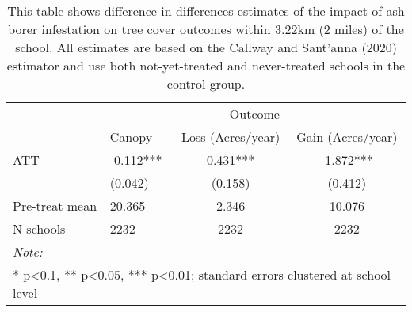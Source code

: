 \begin{table}[!h]

\caption{\label{tab:school-tree-table}This table shows difference-in-differences estimates of the impact of ash borer infestation on tree cover outcomes within 3.22km (2 miles) of the school. All estimates are based on the Callway and Sant'anna (2020) estimator and use both not-yet-treated and never-treated schools in the control group.}
\centering
\begin{tabular}[t]{llcc}
\toprule
\multicolumn{1}{c}{ } & \multicolumn{3}{c}{Outcome} \\
\cmidrule(l{3pt}r{3pt}){2-4}
  & Canopy & Loss (Acres/year) & Gain (Acres/year)\\
\midrule
ATT & -0.112*** & 0.431*** & -1.872***\\
 & (0.042) & (0.158) & (0.412)\\
\midrule
Pre-treat mean & 20.365 & 2.346 & 10.076\\
N schools & 2232 & 2232 & 2232\\
\bottomrule
\multicolumn{4}{l}{\rule{0pt}{1em}\textit{Note: }}\\
\multicolumn{4}{l}{\rule{0pt}{1em}* p<0.1, ** p<0.05, *** p<0.01; standard errors clustered at school level}\\
\end{tabular}
\end{table}

